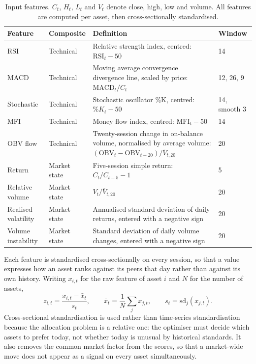 \documentclass{singlecol-new}
\theoremstyle{TH}{
\newtheorem{lemma}{Lemma}
\newtheorem{theorem}[lemma]{Theorem}
\newtheorem{corrolary}[lemma]{Corrolary}
\newtheorem{conjecture}[lemma]{Conjecture}
\newtheorem{proposition}[lemma]{Proposition}
\newtheorem{claim}[lemma]{Claim}
\newtheorem{stheorem}[lemma]{Wrong Theorem}
\newtheorem{algorithm}{Algorithm}
}
\theoremstyle{THrm}{
\newtheorem{definition}{Definition}[section]
\newtheorem{question}{Question}[section]
\newtheorem{remark}{Remark}
\newtheorem{scheme}{Scheme}
}
\theoremstyle{THhit}{
\newtheorem{case}{Case}[section]
}
\begin{document}
\begin{table}[!ht]
\centering
\caption{Input features. $C_t$, $H_t$, $L_t$ and $V_t$ denote close, high, low and
volume. All features are computed per asset, then cross-sectionally standardised.}
\label{tab:features}
\small
\begin{tabular}{p{2.0cm}p{1.8cm}p{5.2cm}p{1.5cm}}
\hline
\textbf{Feature} & \textbf{Composite} & \textbf{Definition} & \textbf{Window} \\
\hline
RSI & Technical & Relative strength index, centred: $\mathrm{RSI}_t - 50$ & 14 \\
\hline
MACD & Technical & Moving average convergence divergence line, scaled by price: $\mathrm{MACD}_t / C_t$ & 12, 26, 9 \\
\hline
Stochastic & Technical & Stochastic oscillator \%K, centred: $\%K_t - 50$ & 14, smooth 3 \\
\hline
MFI & Technical & Money flow index, centred: $\mathrm{MFI}_t - 50$ & 14 \\
\hline
OBV flow & Technical & Twenty-session change in on-balance volume, normalised by average volume: $(\mathrm{OBV}_t - \mathrm{OBV}_{t-20}) / \overline{V}_{t,20}$ & 20 \\
\hline
Return & Market state & Five-session simple return: $C_t / C_{t-5} - 1$ & 5 \\
\hline
Relative volume & Market state & $V_t / \overline{V}_{t,20}$ & 20 \\
\hline
Realised volatility & Market state & Annualised standard deviation of daily returns, entered with a negative sign & 20 \\
\hline
Volume instability & Market state & Standard deviation of daily volume changes, entered with a negative sign & 20 \\
\hline
\end{tabular}
\end{table}

Each feature is standardised cross-sectionally on every session, so that a value
expresses how an asset ranks against its peers that day rather than against its own
history. Writing $x_{i,t}$ for the raw feature of asset $i$ and $N$ for the number of
assets,
\begin{equation}
z_{i,t} = \frac{x_{i,t} - \bar{x}_t}{s_t}, \qquad
\bar{x}_t = \frac{1}{N}\sum_{j} x_{j,t}, \qquad
s_t = \mathrm{sd}_j(x_{j,t}).
\end{equation}
Cross-sectional standardisation is used rather than time-series standardisation because
the allocation problem is a relative one: the optimiser must decide which assets to
prefer today, not whether today is unusual by historical standards. It also removes the
common market factor from the scores, so that a market-wide move does not appear as a
signal on every asset simultaneously.
\end{document}
